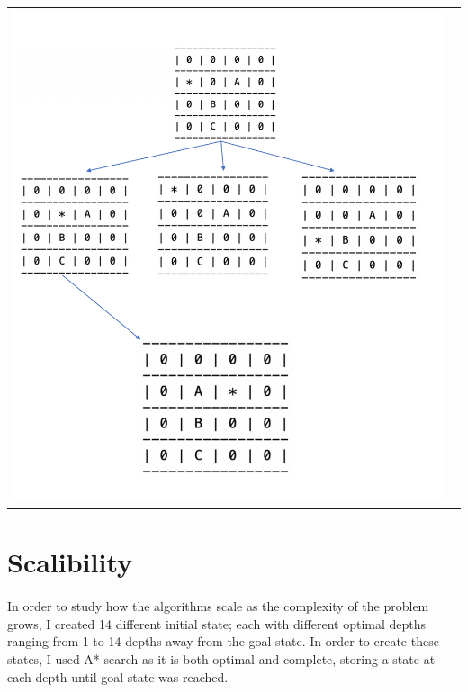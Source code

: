 \documentclass[10pt]{article}
\begin{document}
  \begin{center}
    \begin{tabular}{cc}
    \includegraphics[width=1\textwidth]{images/A*.png} \\
      \end{tabular}
    \end{center}

  \section{Scalibility}
  \paragraph{} \indent
  In order to study how the algorithms scale as the complexity of the problem grows, I created 14 different initial state; each with different optimal depths ranging from 1 to 14 depths away from the goal state. In order to create these states, I used A* search as it is both optimal and complete, storing a state at each depth until goal state was reached. 
\end{document}

